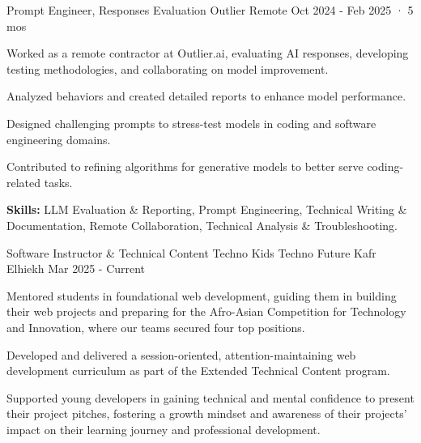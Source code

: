 

\begin{cventries}
  \cventry
    {Prompt Engineer, Responses Evaluation} %
    {Outlier} %
    {Remote} %
    {Oct 2024 - Feb 2025 · 5 mos} %
    {
      \begin{cvitems} %
        \item {Worked as a remote contractor at Outlier.ai, evaluating AI responses, developing testing methodologies, and collaborating on model improvement.}
        \item {Analyzed behaviors and created detailed reports to enhance model performance.}
        \item {Designed challenging prompts to stress-test models in coding and software engineering domains.}
        \item {Contributed to refining algorithms for generative models to better serve coding-related tasks.}
        \item {\textbf{Skills:} LLM Evaluation \& Reporting, Prompt Engineering, Technical Writing \& Documentation, Remote Collaboration, Technical Analysis \& Troubleshooting.}
      \end{cvitems}
    }



\cventry
{Software Instructor \& Technical Content} %
{Techno Kids Techno Future} %
{Kafr Elhiekh} %
{Mar 2025 - Current} %
{
  \begin{cvitems} %
    \item {Mentored students in foundational web development, guiding them in building their web projects and preparing for the Afro-Asian Competition for Technology and Innovation, where our teams secured four top positions.}
    \item {Developed and delivered a session-oriented, attention-maintaining web development curriculum as part of the Extended Technical Content program.}
    \item {Supported young developers in gaining technical and mental confidence to present their project pitches, fostering a growth mindset and awareness of their projects' impact on their learning journey and professional development.}
  \end{cvitems}
}


\end{cventries}
